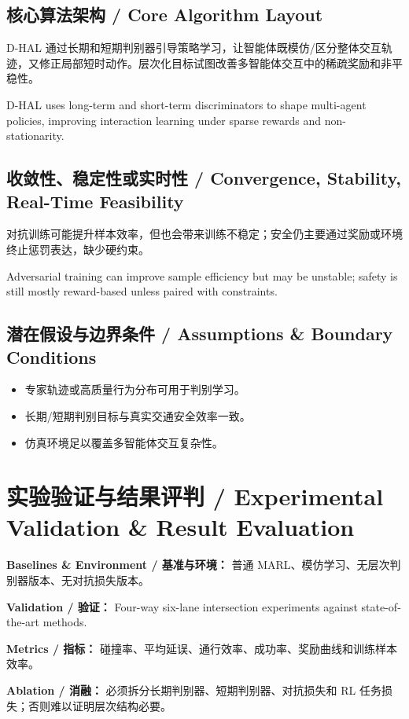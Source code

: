 \documentclass[UTF8,a4paper,11pt,fontset=fandol]{ctexart}
\begin{document}
\subsection{核心算法架构 / Core Algorithm Layout}
D-HAL 通过长期和短期判别器引导策略学习，让智能体既模仿/区分整体交互轨迹，又修正局部短时动作。层次化目标试图改善多智能体交互中的稀疏奖励和非平稳性。

D-HAL uses long-term and short-term discriminators to shape multi-agent policies, improving interaction learning under sparse rewards and non-stationarity.

\subsection{收敛性、稳定性或实时性 / Convergence, Stability, Real-Time Feasibility}
对抗训练可能提升样本效率，但也会带来训练不稳定；安全仍主要通过奖励或环境终止惩罚表达，缺少硬约束。

Adversarial training can improve sample efficiency but may be unstable; safety is still mostly reward-based unless paired with constraints.

\subsection{潜在假设与边界条件 / Assumptions \& Boundary Conditions}
\begin{itemize}
\item 专家轨迹或高质量行为分布可用于判别学习。
\item 长期/短期判别目标与真实交通安全效率一致。
\item 仿真环境足以覆盖多智能体交互复杂性。
\end{itemize}


\section{实验验证与结果评判 / Experimental Validation \& Result Evaluation}
\textbf{Baselines \& Environment / 基准与环境：} 普通 MARL、模仿学习、无层次判别器版本、无对抗损失版本。

\textbf{Validation / 验证：} Four-way six-lane intersection experiments against state-of-the-art methods.

\textbf{Metrics / 指标：} 碰撞率、平均延误、通行效率、成功率、奖励曲线和训练样本效率。

\textbf{Ablation / 消融：} 必须拆分长期判别器、短期判别器、对抗损失和 RL 任务损失；否则难以证明层次结构必要。
\end{document}
